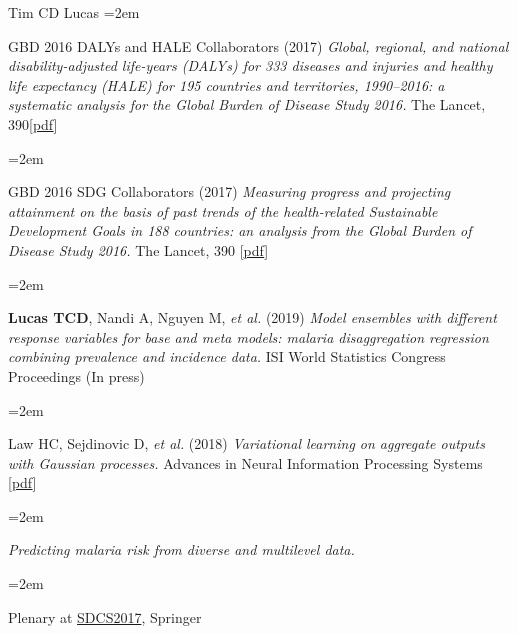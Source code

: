 \documentclass{scrartcl}
\newcommand{\MarginText}[1]{\marginpar{\raggedleft\itshape\small#1}} %
\newcommand{\Description}[1]{\hangindent=2em\hangafter=0\noindent\raggedright\footnotesize{#1}\par\normalsize\vspace{1em}} %
\newcommand{\MoreDescription}[1]{\hangindent=2em\hangafter=0\noindent\raggedright\scriptsize{#1}\par\normalsize\vspace{1em}} %
\begin{document}
\begin{cv}{Tim {\Large CD} Lucas}
\Description{GBD 2016 DALYs and HALE Collaborators (2017) \emph{Global, regional, and national disability-adjusted life-years (DALYs) for 333 diseases and injuries and healthy life expectancy (HALE) for 195 countries and territories, 1990--2016: a systematic analysis for the Global Burden of Disease Study 2016.} The Lancet, 390[\href{https://www.thelancet.com/action/showPdf?pii=S0140-6736\%2817\%2932130-X}{pdf}]}

\Description{GBD 2016 SDG Collaborators (2017) \emph{Measuring progress and projecting attainment on the basis of past trends of the health-related Sustainable Development Goals in 188 countries: an analysis from the Global Burden of Disease Study 2016.} The Lancet, 390 [\href{https://www.thelancet.com/action/showPdf?pii=S0140-6736\%2817\%2932336-X}{pdf}]}


{\color{Maroon}}\vspace{1em}

\Description{\MarginText{2019}\textbf{Lucas TCD}, Nandi A, Nguyen M, \emph{et al.} (2019) \emph{Model ensembles with different response variables for base and meta models: malaria disaggregation regression combining prevalence and incidence data.} ISI World Statistics Congress Proceedings (In press)}


\Description{\MarginText{2018}Law HC, Sejdinovic D, \emph{et al.} (2018) \emph{Variational learning on aggregate outputs with Gaussian processes.} Advances in Neural Information Processing Systems [\href{http://papers.nips.cc/paper/7847-variational-learning-on-aggregate-outputs-with-gaussian-processes.pdf}{pdf}]}


\vspace{1em} %



{\color{Maroon}}\vspace{1em}

\Description{\MarginText{2017}\emph{Predicting malaria risk from diverse and multilevel data.}}\vspace{-1em}
\MoreDescription{Plenary at \href{http://www.springer.com/gb/book/9789811072413}{SDCS2017}, Springer}
\vspace{-0.5em}




\end{cv}
\end{document}
